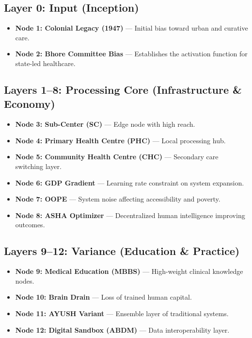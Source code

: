 \documentclass[12pt]{article}
\begin{document}
\subsection{Layer 0: Input (Inception)}

\begin{itemize}
\item \textbf{Node 1: Colonial Legacy (1947)} — Initial bias toward urban and curative care.
\item \textbf{Node 2: Bhore Committee Bias} — Establishes the activation function for state-led healthcare.
\end{itemize}

\subsection{Layers 1–8: Processing Core (Infrastructure \& Economy)}

\begin{itemize}
\item \textbf{Node 3: Sub-Center (SC)} — Edge node with high reach.
\item \textbf{Node 4: Primary Health Centre (PHC)} — Local processing hub.
\item \textbf{Node 5: Community Health Centre (CHC)} — Secondary care switching layer.
\item \textbf{Node 6: GDP Gradient} — Learning rate constraint on system expansion.
\item \textbf{Node 7: OOPE} — System noise affecting accessibility and poverty.
\item \textbf{Node 8: ASHA Optimizer} — Decentralized human intelligence improving outcomes.
\end{itemize}

\subsection{Layers 9–12: Variance (Education \& Practice)}

\begin{itemize}
\item \textbf{Node 9: Medical Education (MBBS)} — High-weight clinical knowledge nodes.
\item \textbf{Node 10: Brain Drain} — Loss of trained human capital.
\item \textbf{Node 11: AYUSH Variant} — Ensemble layer of traditional systems.
\item \textbf{Node 12: Digital Sandbox (ABDM)} — Data interoperability layer.
\end{itemize}
\end{document}
